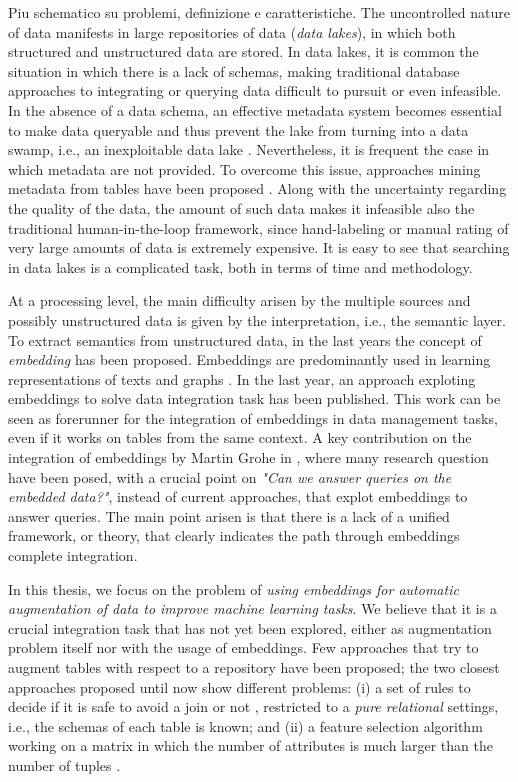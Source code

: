 {\color{red}Piu schematico su problemi, definizione e caratteristiche.}
The uncontrolled nature of data manifests in large repositories of data (\textit{data lakes}), in which both structured and unstructured data are stored. In data lakes, it is common the situation in which there is a lack of schemas, making traditional database approaches to integrating or querying data difficult to pursuit or even infeasible. In the absence of a data schema, an effective metadata system becomes essential to make data queryable and thus prevent the lake from turning into a data swamp, i.e., an inexploitable data lake \cite{walker2015personal,hai2016constance}. Nevertheless, it is frequent the case in which metadata are not provided. To overcome this issue, approaches mining metadata from tables have been proposed \cite{arocena2015ibench,suriarachchi2016crossing}.
Along with the uncertainty regarding the quality of the data, the amount of such data makes it infeasible also the traditional human-in-the-loop framework, since hand-labeling or manual rating of very large amounts of data is extremely expensive. It is easy to see that searching in data lakes is a complicated task, both in terms of time and methodology. 

At a processing level, the main difficulty arisen by the multiple sources and possibly unstructured data is given by the interpretation, i.e., the semantic layer. To extract semantics from unstructured data, in the last years the concept of \textit{embedding} has been proposed. Embeddings are predominantly used in learning representations of texts \cite{mikolov2013efficient} and graphs \cite{nickel2017poincare}. In the last year, an approach exploting embeddings to solve data integration task \cite{cappuzzo2020creating} has been published. This work can be seen as forerunner for the integration of embeddings in data management tasks, even if it works on tables from the same context. A key contribution on the integration of embeddings by Martin Grohe in \cite{grohe2020word2vec}, where many research question have been posed, with a crucial point on \textit{"Can we answer queries on the embedded data?"}, instead of current approaches, that explot embeddings to answer queries. The main point arisen is that there is a lack of a unified framework, or theory, that clearly indicates the path through embeddings complete integration. 


In this thesis, we focus on the problem of \textit{using embeddings for automatic augmentation of data to improve machine learning tasks}. We believe that it is a crucial integration task that has not yet been explored, either as augmentation problem itself nor with the usage of embeddings. Few approaches that try to augment tables with respect to a repository have been proposed; the two closest approaches proposed until now show different problems: (i) a set of rules to decide if it is safe to avoid a join or not \cite{kumar2016join}, restricted to a \textit{pure relational} settings, i.e., the schemas of each table is known; and (ii) a feature selection algorithm working on a matrix in which the number of attributes is much larger than the number of tuples \cite{chepurko2020arda}. 

